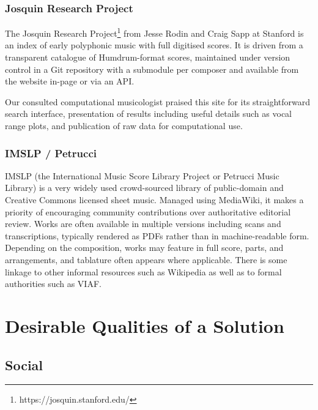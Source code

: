\documentclass[sigconf, nonacm=true]{acmart}
\begin{document}
\begin{sloppypar}
  \subsubsection{Josquin Research Project}

  The Josquin Research Project\footnote{https://josquin.stanford.edu/}
  from Jesse Rodin and Craig Sapp at Stanford is an index of early
  polyphonic music with full digitised scores. It is driven from a
  transparent catalogue of Humdrum-format scores, maintained under
  version control in a Git repository with a submodule per composer
  and available from the website in-page or via an API.

  Our consulted computational musicologist praised this site for its
  straightforward search interface, presentation of results including
  useful details such as vocal range plots, and publication of raw
  data for computational use.
  
  \subsubsection{IMSLP / Petrucci}

  IMSLP (the International Music Score Library Project or Petrucci
  Music Library) is a very widely used crowd-sourced library of
  public-domain and Creative Commons licensed sheet music. Managed
  using MediaWiki, it makes a priority of encouraging community
  contributions over authoritative editorial review. Works are often
  available in multiple versions including scans and transcriptions,
  typically rendered as PDFs rather than in machine-readable
  form. Depending on the composition, works may feature in full score,
  parts, and arrangements, and tablature often appears where
  applicable. There is some linkage to other informal resources such
  as Wikipedia as well as to formal authorities such as VIAF.
  
  \section{Desirable Qualities of a Solution}\label{desirable-qualities}
  \subsection{Social}


\end{sloppypar}
\end{document}
